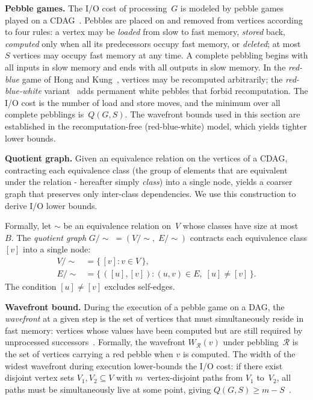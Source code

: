 \textbf{Pebble games.}  The I/O cost of processing~$G$ is modeled by pebble games played on a CDAG~\cite{PebbleGame, ElangoWavefront1}.  Pebbles are placed on and removed from vertices according to four rules: a vertex may be \emph{loaded} from slow to fast memory, \emph{stored} back, \emph{computed} only when all its predecessors occupy fast memory, or \emph{deleted}; at most~$S$ vertices may occupy fast memory at any time.  A complete pebbling begins with all inputs in slow memory and ends with all outputs in slow memory.  In the \emph{red-blue} game of Hong and Kung~\cite{PebbleGame}, vertices may be recomputed arbitrarily; the \emph{red-blue-white} variant~\cite{ElangoWavefront1} adds permanent white pebbles that forbid recomputation.  The I/O cost is the number of load and store moves, and the minimum over all complete pebblings is~$Q(G, S)$.  The wavefront bounds used in this section are established in the recomputation-free (red-blue-white) model, which yields tighter lower bounds.

\textbf{Quotient graph.} Given an equivalence relation on the vertices of a CDAG, contracting each equivalence class (the group of elements that are equivalent under the relation - hereafter simply \emph{class}) into a single node, yields a coarser graph that preserves only inter-class dependencies.  We use this construction to derive I/O lower bounds.


Formally, let $\sim$ be an equivalence relation on~$V$ whose classes have size at most~$B$.  The \emph{quotient graph} $G/{\sim}\; = (V/{\sim},\; E/{\sim})$ contracts each equivalence class $[v]$ into a single node:
%
\begin{align}
  V/{\sim} &= \bigl\{\,[v] : v \in V\,\bigr\}, \label{eq:quotient-V}\\
  E/{\sim} &= \bigl\{\,([u],[v]) : (u,v) \in E,\; [u] \neq [v]\,\bigr\}.
  \label{eq:quotient-E}
\end{align}
%
The condition $[u] \neq [v]$ excludes self-edges.

\textbf{Wavefront bound.}  During the execution of a pebble game on a DAG, the \emph{wavefront} at a given step is the set of vertices that must simultaneously reside in fast memory: vertices whose values have been computed but are still required by unprocessed successors~\cite{ElangoWavefront1, AutomatedDerivationIOAffine}.  Formally, the wavefront $W_{\mathcal{R}}(v)$ under pebbling~$\mathcal{R}$ is the set of vertices carrying a red pebble when $v$ is computed.  The width of the widest wavefront during execution lower-bounds the I/O cost: if there exist disjoint vertex sets $V_1, V_2 \subseteq V$ with $m$~vertex-disjoint paths from $V_1$ to~$V_2$, all paths must be simultaneously live at some point, giving $Q(G, S) \geq m - S$~\cite{ElangoWavefront1}.

